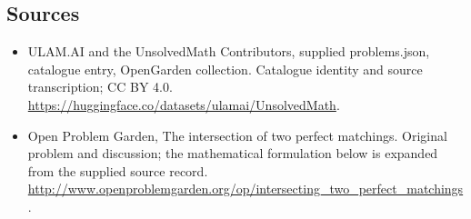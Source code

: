 \documentclass[11pt,a4paper]{article}
\begin{document}
\subsection{Sources}
\begin{itemize}
\item[S1] ULAM.AI and the UnsolvedMath Contributors, supplied problems.json, catalogue entry, OpenGarden collection. Catalogue identity and source transcription; CC BY 4.0.
\url{https://huggingface.co/datasets/ulamai/UnsolvedMath}.
\item[S2] Open Problem Garden, The intersection of two perfect matchings. Original problem and discussion; the mathematical formulation below is expanded from the supplied source record.
\url{http://www.openproblemgarden.org/op/intersecting_two_perfect_matchings}.

\end{itemize}
\end{document}
